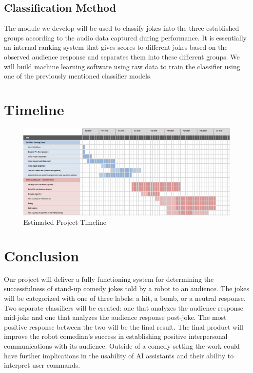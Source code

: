 \documentclass[onecolumn, draftclsnofoot,10pt, compsoc]{IEEEtran}
\begin{document}
\subsection{Classification Method}
The module we develop will be used to classify jokes into the three established groups according to the audio data captured during performance. It is essentially an internal ranking system that gives scores to different jokes based on the observed audience response and separates them into these different groups. We will build machine learning software using raw data to train the classifier using one of the previously mentioned classifier models.

\newpage
\section{Timeline}
\begin{figure}[ht]
\includegraphics[width=\linewidth]{gantt.eps}
\caption{Estimated Project Timeline}
\end{figure}

\section{Conclusion}
Our project will deliver a fully functioning system for determining the successfulness of stand-up comedy jokes told by a robot to an audience. The jokes will be categorized with one of three labels: a hit, a bomb, or a neutral response. Two separate classifiers will be created: one that analyzes the audience response mid-joke and one that analyzes the audience response post-joke. The most positive response between the two will be the final result. The final product will improve the robot comedian's success in establishing positive interpersonal communications with its audience. Outside of a comedy setting the work could have further implications in the usability of AI assistants and their ability to interpret user commands.
\end{document}
